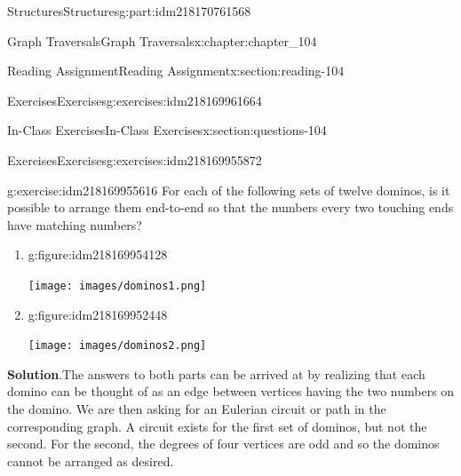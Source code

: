 \documentclass[oneside,10pt,]{book}
\newcommand{\blocktitlefont}{\relax}
\numberwithin{equation}{section}
\begin{document}
\begin{partptx}{Structures}{}{Structures}{}{}{g:part:idm218170761568}
\begin{chapterptx}{Graph Traversals}{}{Graph Traversals}{}{}{x:chapter:chapter_104}
\begin{sectionptx}{Reading Assignment}{}{Reading Assignment}{}{}{x:section:reading-104}
\begin{exercises-subsection-numberless}{Exercises}{}{Exercises}{}{}{g:exercises:idm218169961664}
\begin{exercisegroup}
\end{exercisegroup}
\par\medskip\noindent
\end{exercises-subsection-numberless}
\end{sectionptx}
%
%
\typeout{************************************************}
\typeout{************************************************}
%
\begin{sectionptx}{In-Class Exercises}{}{In-Class Exercises}{}{}{x:section:questions-104}
%
%
%
\typeout{************************************************}
\typeout{************************************************}
%
\begin{exercises-subsection-numberless}{Exercises}{}{Exercises}{}{}{g:exercises:idm218169955872}
\par\medskip\noindent%
%
\begin{exercisegroup}
\begin{divisionexerciseeg}{1}{}{}{g:exercise:idm218169955616}%
For each of the following sets of twelve dominos, is it possible to arrange them end-to-end so that the numbers every two touching ends have matching numbers?%
\begin{enumerate}[label=(\alph*)]
\item{}\begin{figureptx}{}{g:figure:idm218169954128}{}%
\begin{image}{0}{1}{0}%
\texttt{[image: images/dominos1.png]}
\end{image}%
\tcblower
\end{figureptx}%
%
\item{}\begin{figureptx}{}{g:figure:idm218169952448}{}%
\begin{image}{0}{1}{0}%
\texttt{[image: images/dominos2.png]}
\end{image}%
\tcblower
\end{figureptx}%
%
\end{enumerate}
%
\par\smallskip%
\noindent\textbf{\blocktitlefont Solution}.\hypertarget{g:solution:idm218169952032}{}\quad{}The answers to both parts can be arrived at by realizing that each domino can be thought of as an edge between vertices having the two numbers on the domino.  We are then asking for an Eulerian circuit or path in the corresponding graph.  A circuit exists  for the first set of dominos, but not the second. For the second, the degrees of four vertices are odd and so the dominos cannot be arranged as desired.%

\end{divisionexerciseeg}
\end{exercisegroup}
\end{exercises-subsection-numberless}
\end{sectionptx}
\end{chapterptx}
\end{partptx}
\end{document}
